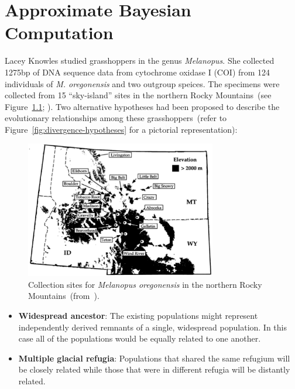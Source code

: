 \chapter{Approximate Bayesian Computation}

Lacey Knowles studied grasshoppers in the genus {\it Melanopus}. She
collected 1275bp of DNA sequence data from cytochrome oxidase I (COI)
from 124 individuals of {\it M. oregonensis\/} and two outgroup
speices. The specimens were collected from 15 ``sky-island'' sites in
the northern Rocky Mountains~(see Figure~\ref{fig:sky-islands};
\cite{Knowles-2001}). Two alternative hypotheses had been proposed to
describe the evolutionary relationships among these
grasshoppers~(refer to Figure~\ref{fig:divergence-hypotheses} for a
pictorial representation):

\begin{figure}
\begin{center}
\includegraphics[height=6cm]{sky-islands.eps}
\end{center}
\caption{Collection sites for {\it Melanopus oregonensis\/} in the
  northern Rocky Mountains~(from~\cite{Knowles-2001}).}\label{fig:sky-islands}
\end{figure}

\begin{itemize}

\item {\bf Widespread ancestor}: The existing populations might represent
  independently derived remnants of a single, widespread
  population. In this case all of the populations would be equally
  related to one another.

\item {\bf Multiple glacial refugia}: Populations that shared the same
  refugium will be closely related while those that were in different
  refugia will be distantly related.

\end{itemize}

